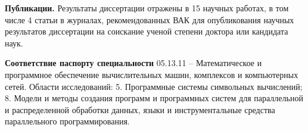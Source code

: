 \documentclass[a4paper]{report}
\begin{document}
\textbf{Публикации.} Результаты диссертации отражены в 15 научных работах, в том числе 4 статьи в журналах, рекомендованных ВАК для опубликования научных результатов диссертации на соискание ученой степени доктора или кандидата наук.









\textbf{Соответствие паспорту специальности}
05.13.11 -- Математическое и программное обеспечение вычислительных машин, комплексов и компьютерных сетей. Области исследований: 
5. Программные системы символьных вычислений; 
8. Модели и методы создания программ и программных систем для параллельной и распределенной обработки данных, языки и инструментальные средства параллельного программирования.
\end{document}
